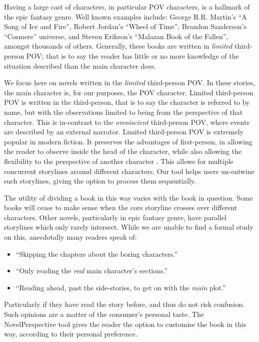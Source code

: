 \documentclass[11pt,a4paper]{article}
\newcommand{\parencite}{\citep}
\begin{document}
Having a large cast of characters, in particular POV characters, is a hallmark of the epic fantasy genre.
Well known examples include: George R.R. Martin's ``A Song of Ice and Fire'', 
Robert Jordan's ``Wheel of Time'', Brandon Sanderson's ``Cosmere'' universe, and
Steven Erikson's ``Malazan Book of the Fallen'', amongst thousands of others.
Generally, these books are written in \emph{limited} third-person POV;
that is to say the reader has little or no more knowledge of the situation described than the main character does.

We focus here on novels written in the \emph{limited} third-person POV.
In these stories, the main character is, for our purposes, the POV character.
Limited third-person POV is written in the third-person, that is to say the character is referred to by name, but with the observations limited to being from the perspective of that character.
This is in-contrast to the \emph{omniscient} third-person POV, where events are described by an external narrator.
Limited third-person POV is extremely popular in modern fiction.
It preserves the advantages of first-person, in allowing the reader to observe inside the head of the character, while also allowing the flexibility to the perspective of another character \parencite{booth2010rhetoric}.
This allows for multiple concurrent storylines around different characters.
Our tool helps users un-entwine such storylines, giving the option to process them sequentially.


The utility of dividing a book in this way varies with the book in question.
Some books will cease to make sense when the core storyline crosses over different characters.
Other novels, particularly in epic fantasy genre,
have parallel storylines which only rarely intersect.
While we are unable to find a formal study on this, 
anecdotally many readers speak of:
\begin{itemize}
	\item ``Skipping the chapters about the boring characters.''
	\item ``Only reading the \emph{real} main character's sections.''
	\item ``Reading ahead, past the side-stories, to get on with the \emph{main} plot.''	
\end{itemize}
Particularly if they have read the story before, and thus do not risk confusion.
Such opinions are a matter of the consumer's personal taste.
The NovelPerspective tool gives the reader the option to customise the book in this way, according to their personal preference.
\end{document}

